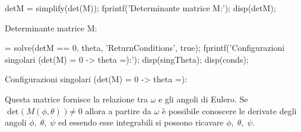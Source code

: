 \documentclass[11pt, a4paper]{article}
\begin{document}
\newpage
\begin{matlabcode}
detM = simplify(det(M));
fprintf('Determinante matrice M:');
disp(detM);
\end{matlabcode}
\begin{matlaboutput}
Determinante matrice M:
\end{matlaboutput}
\begin{matlabsymbolicoutput}
\hskip1em $\displaystyle -\cos \left(\theta \right)$
\end{matlabsymbolicoutput}
\begin{matlabcode}
 = solve(detM == 0, theta, 'ReturnConditions', true);
fprintf('Configurazioni singolari (det(M) = 0 -> theta =):\n');
disp(singTheta);
disp(conds);
\end{matlabcode}
\begin{matlaboutput}
Configurazioni singolari (det(M) = 0 -> theta =):
\end{matlaboutput}

\begin{par}
\begin{flushleft}
Questa matrice fornisce la relazione tra $\omega$ e gli angoli di Eulero. Se $\det \bigl(\;M(\phi ,\theta )\;\bigr)\not= 0$ allora a partire da $\omega$ è possibile conoscere le derivate degli angoli $\dot{\phi} ,\;\dot{\theta} ,\;\dot{\psi}$ ed essendo esse integrabili si possono ricavare $\phi ,\;\theta ,\;\psi$.
\end{flushleft}
\end{par}
\end{document}
